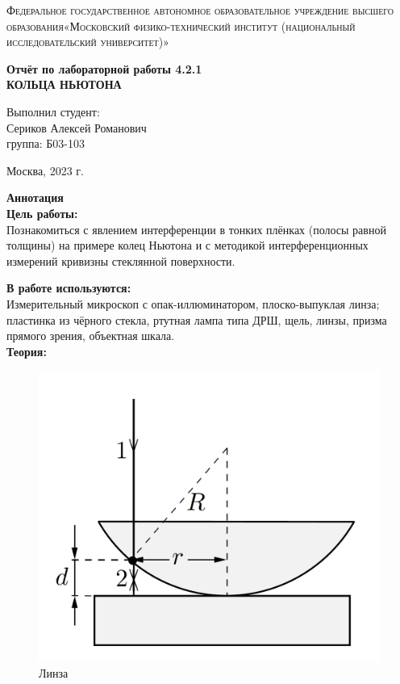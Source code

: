 \documentclass[a4paper, 12pt]{article}%
\begin{document}
\begin{titlepage}
\begin{center}
\textsc{Федеральное государственное автономное образовательное учреждение высшего образования«Московский физико-технический институт (национальный исследовательский университет)»\\[5mm]
}

\vfill

\textbf{Отчёт по лабораторной работы 4.2.1 \\[3mm]
КОЛЬЦА НЬЮТОНА
\\[50mm]
}

\end{center}

\hfill
\begin{minipage}{.5\textwidth}
Выполнил студент:\\[2mm]
Сериков Алексей Романович\\[2mm]
группа: Б03-103\\[5mm]

\end{minipage}
\vfill
\begin{center}
Москва, 2023 г.
\end{center}

\end{titlepage}

\newpage
\textbf{Аннотация}\\


\textbf{Цель работы: }\\

Познакомиться с явлением интерференции в тонких плёнках (полосы равной толщины) на примере колец Ньютона и с методикой интерференционных измерений кривизны стеклянной поверхности.

	\textbf{В работе используются: }\\
	
Измерительный микроскоп с опак-иллюминатором, плоско-выпуклая линза; пластинка из чёрного стекла, ртутная лампа типа ДРШ, щель, линзы, призма прямого зрения, объектная шкала.\\



\textbf{Теория:}


\begin{figure}[H]
	\begin{center}
		\includegraphics[width=0.5\linewidth]{Lens.png}
		\caption{Линза}
	\end{center}
\end{figure}
\end{document}
